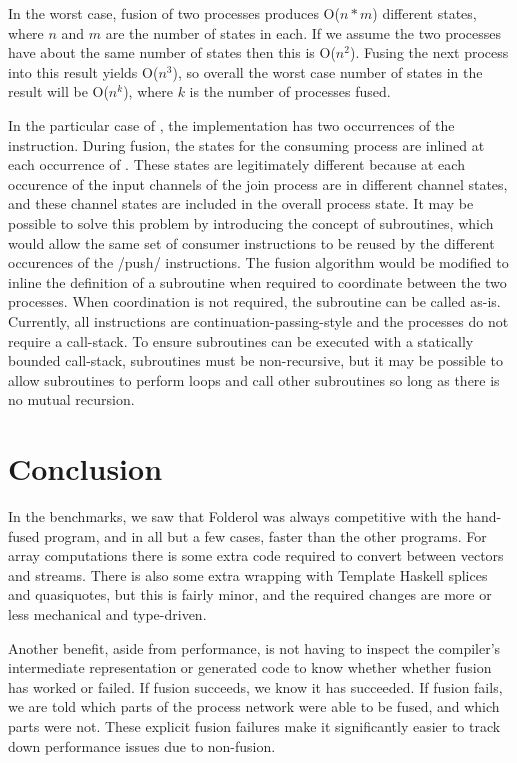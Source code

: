 In the worst case, fusion of two processes produces O($n*m$) different states, where $n$ and $m$ are the number of states in each. If we assume the two processes have about the same number of states then this is O($n^2$). Fusing the next process into this result yields O($n^3$), so overall the worst case number of states in the result will be O($n^k$), where $k$ is the number of processes fused. 

In the particular case of \Hs@join@, the implementation has two occurrences of the \Hs@push@ instruction.
During fusion, the states for the consuming process are inlined at each occurrence of \Hs@push@.
These states are legitimately different because at each occurence of \Hs@push@ the input channels of the join process are in different channel states, and these channel states are included in the overall process state.
It may be possible to solve this problem by introducing the concept of subroutines, which would allow the same set of consumer instructions to be reused by the different occurences of the \Hs/push/ instructions.
The fusion algorithm would be modified to inline the definition of a subroutine when required to coordinate between the two processes.
When coordination is not required, the subroutine can be called as-is.
Currently, all instructions are continuation-passing-style and the processes do not require a call-stack.
To ensure subroutines can be executed with a statically bounded call-stack, subroutines must be non-recursive, but it may be possible to allow subroutines to perform loops and call other subroutines so long as there is no mutual recursion.

\section{Conclusion}
In the benchmarks, we saw that Folderol was always competitive with the hand-fused program, and in all but a few cases, faster than the other programs.
For array computations there is some extra code required to convert between vectors and streams.
There is also some extra wrapping with Template Haskell splices and quasiquotes, but this is fairly minor, and the required changes are more or less mechanical and type-driven.

Another benefit, aside from performance, is not having to inspect the compiler's intermediate representation or generated code to know whether whether fusion has worked or failed.
If fusion succeeds, we know it has succeeded.
If fusion fails, we are told which parts of the process network were able to be fused, and which parts were not.
These explicit fusion failures make it significantly easier to track down performance issues due to non-fusion.

